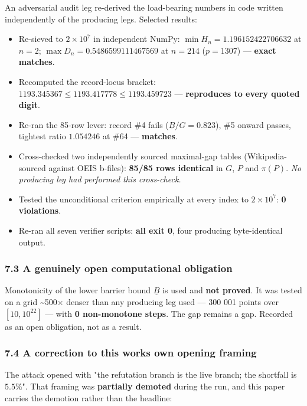 \documentclass[
  a4paper,
  11pt]{article}
\providecommand{\tightlist}{%
  \setlength{\itemsep}{0pt}\setlength{\parskip}{0pt}}
\begin{document}
An adversarial audit leg re-derived the load-bearing numbers in code
written independently of the producing legs. Selected results:

\begin{itemize}
\tightlist
\item
  Re-sieved to \(2\times10^{7}\) in independent NumPy:
  \(\min H_n = 1.196152422706632\) at \(n=2\);
  \(\max D_n = 0.5486599111467569\) at \(n=214\) (\(p=1307\)) ---
  \textbf{exact matches}.
\item
  Recomputed the record-locus bracket:
  \(1193.345367 \le 1193.417778 \le 1193.459723\) --- \textbf{reproduces
  to every quoted digit}.
\item
  Re-ran the 85-row lever: record \#4 fails
  (\(\underline{B}/G = 0.823\)), \#5 onward passes, tightest ratio
  \(1.054246\) at \#64 --- \textbf{matches}.
\item
  Cross-checked two independently sourced maximal-gap tables
  (Wikipedia-sourced against OEIS b-files): \textbf{85/85 rows
  identical} in \(G\), \(P\) and \(\pi(P)\). \emph{No producing leg had
  performed this cross-check.}
\item
  Tested the unconditional criterion empirically at every index to
  \(2\times10^{7}\): \textbf{0 violations}.
\item
  Re-ran all seven verifier scripts: \textbf{all exit 0}, four producing
  byte-identical output.
\end{itemize}

\subsubsection{7.3 A genuinely open computational
obligation}\label{73-a-genuinely-open-computational-obligation}

Monotonicity of the lower barrier bound \(\underline{B}\) is used and
\textbf{not proved}. It was tested on a grid \textasciitilde500× denser
than any producing leg used --- 300 001 points over \([10, 10^{22}]\)
--- with \textbf{0 non-monotone steps}. The gap remains a gap. Recorded
as an open obligation, not as a result.

\subsubsection{7.4 A correction to this work\textquotesingle s own
opening
framing}\label{74-a-correction-to-this-works-own-opening-framing}

The attack opened with "the refutation branch is the live branch; the
shortfall is \(5.5\%\)". That framing was \textbf{partially demoted}
during the run, and this paper carries the demotion rather than the
headline:
\end{document}
